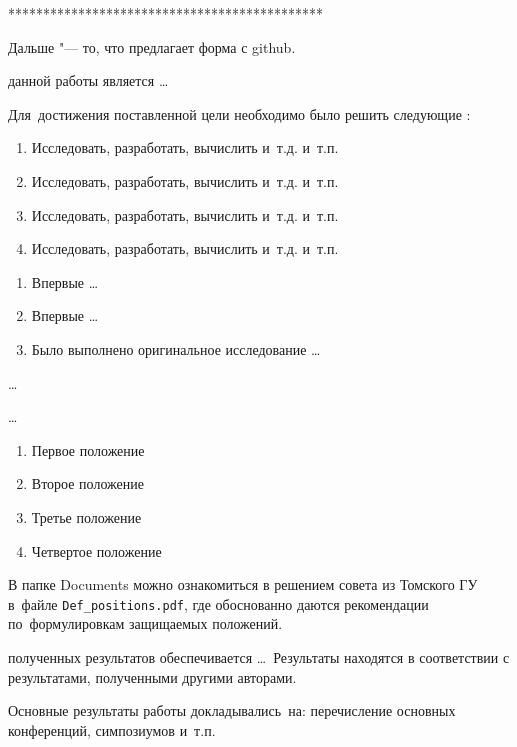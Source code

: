 \newpage
*********************************************

Дальше "--- то, что предлагает форма с github.

{\aim} данной работы является \ldots

Для~достижения поставленной цели необходимо было решить следующие {\tasks}:
\begin{enumerate}
  \item Исследовать, разработать, вычислить и~т.\:д. и~т.\:п.
  \item Исследовать, разработать, вычислить и~т.\:д. и~т.\:п.
  \item Исследовать, разработать, вычислить и~т.\:д. и~т.\:п.
  \item Исследовать, разработать, вычислить и~т.\:д. и~т.\:п.
\end{enumerate}


{\novelty}
\begin{enumerate}
  \item Впервые \ldots
  \item Впервые \ldots
  \item Было выполнено оригинальное исследование \ldots
\end{enumerate}

{\influence} \ldots

{\methods} \ldots

{}
\begin{enumerate}
  \item Первое положение
  \item Второе положение
  \item Третье положение
  \item Четвертое положение
\end{enumerate}
В папке Documents можно ознакомиться в решением совета из Томского ГУ
в~файле \verb+Def_positions.pdf+, где обоснованно даются рекомендации
по~формулировкам защищаемых положений.

{\reliability} полученных результатов обеспечивается \ldots \ Результаты находятся в соответствии с результатами, полученными другими авторами.


{\probation}
Основные результаты работы докладывались~на:
перечисление основных конференций, симпозиумов и~т.\:п.

